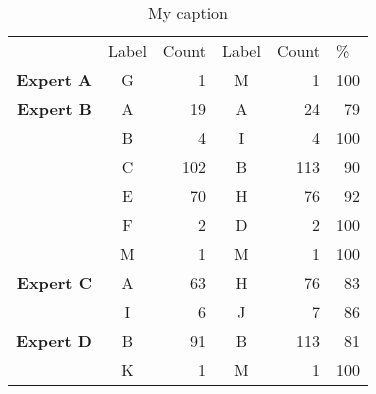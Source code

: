 \begin{table}[]
\centering
\caption{My caption}
\label{my-label}
\begin{tabular}{rcr|crr}
\multicolumn{1}{l}{} & \multicolumn{1}{l}{Label} & \multicolumn{1}{l|}{Count} & \multicolumn{1}{l}{Label} & \multicolumn{1}{l}{Count} & \multicolumn{1}{l}{\%} \\
\textbf{Expert A} & G & 1 & M & 1 & 100 \\
\textbf{Expert B} & A & 19 & A & 24 & 79 \\
 & B & 4 & I & 4 & 100 \\
 & C & 102 & B & 113 & 90 \\
 & E & 70 & H & 76 & 92 \\
 & F & 2 & D & 2 & 100 \\
 & M & 1 & M & 1 & 100 \\
\textbf{Expert C} & A & 63 & H & 76 & 83 \\
 & I & 6 & J & 7 & 86 \\
\textbf{Expert D} & B & 91 & B & 113 & 81 \\
 & K & 1 & M & 1 & 100
\end{tabular}
\end{table}